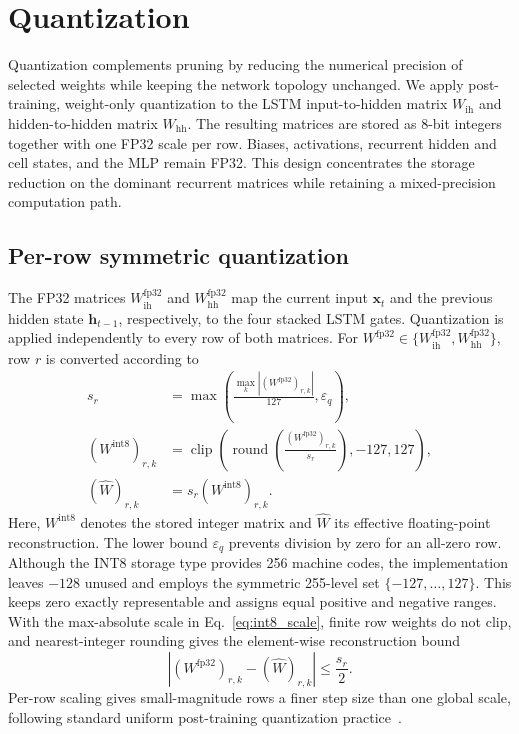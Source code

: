 \documentclass[final,3p,times]{elsarticle}
\begin{document}
\section{Quantization}
Quantization complements pruning by reducing the numerical precision of selected weights while keeping the network topology unchanged. We apply post-training, weight-only quantization to the LSTM input-to-hidden matrix $W_{\mathrm{ih}}$ and hidden-to-hidden matrix $W_{\mathrm{hh}}$. The resulting matrices are stored as 8-bit integers together with one FP32 scale per row. Biases, activations, recurrent hidden and cell states, and the MLP remain FP32. This design concentrates the storage reduction on the dominant recurrent matrices while retaining a mixed-precision computation path.

\subsection{Per-row symmetric quantization}
The FP32 matrices $W_{\mathrm{ih}}^{\mathrm{fp32}}$ and $W_{\mathrm{hh}}^{\mathrm{fp32}}$ map the current input $\mathbf{x}_t$ and the previous hidden state $\mathbf{h}_{t-1}$, respectively, to the four stacked LSTM gates. Quantization is applied independently to every row of both matrices. For $W^{\mathrm{fp32}}\in\{W_{\mathrm{ih}}^{\mathrm{fp32}},W_{\mathrm{hh}}^{\mathrm{fp32}}\}$, row $r$ is converted according to
\begin{align}
    s_r &= \max\!\left(\frac{\max_k |(W^{\mathrm{fp32}})_{r,k}|}{127},\varepsilon_q\right), \label{eq:int8_scale}\\
    (W^{\mathrm{int8}})_{r,k} &= \operatorname{clip}\!\left(\operatorname{round}\!\left(\frac{(W^{\mathrm{fp32}})_{r,k}}{s_r}\right),-127,127\right), \label{eq:int8_q}\\
    (\hat{W})_{r,k} &= s_r(W^{\mathrm{int8}})_{r,k}. \label{eq:int8_w}
\end{align}
Here, $W^{\mathrm{int8}}$ denotes the stored integer matrix and $\hat{W}$ its effective floating-point reconstruction. The lower bound $\varepsilon_q$ prevents division by zero for an all-zero row. Although the INT8 storage type provides 256 machine codes, the implementation leaves $-128$ unused and employs the symmetric 255-level set $\{-127,\ldots,127\}$. This keeps zero exactly representable and assigns equal positive and negative ranges. With the max-absolute scale in Eq.~\eqref{eq:int8_scale}, finite row weights do not clip, and nearest-integer rounding gives the element-wise reconstruction bound
\begin{equation}
    \left|(W^{\mathrm{fp32}})_{r,k}-(\hat{W})_{r,k}\right| \leq \frac{s_r}{2}.
    \label{eq:quant_error_bound}
\end{equation}
Per-row scaling gives small-magnitude rows a finer step size than one global scale, following standard uniform post-training quantization practice~\cite{jacobQuantizationTrainingNeural2017,krishnamoorthiQuantizingDeepConvolutional2018}.
\end{document}
